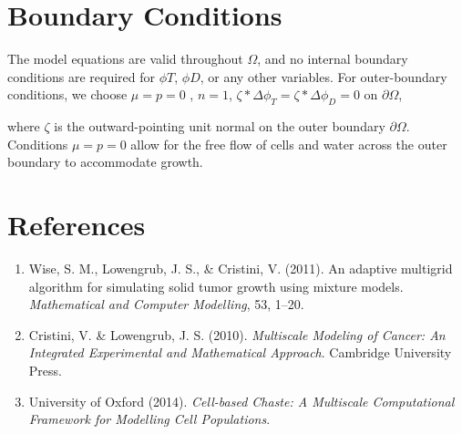 \documentclass[12pt]{article}
\begin{document}
\section*{Boundary Conditions}

 The model equations are valid throughout $\Omega$, and no internal boundary conditions are required for $\phi T$, $\phi D$, or any other variables. For outer-boundary conditions, we choose
$\mu = p = 0$ ,  $n = 1$, $\zeta * \Delta \phi _T = \zeta * \Delta \phi _D = 0$  on $\partial \Omega$,

 where $\zeta$ is the outward-pointing unit normal on the outer boundary $\partial \Omega$. Conditions $\mu = p = 0$ allow for the free flow of cells and water across the outer boundary to accommodate growth. 
 
\section*{References}
\begin{enumerate}
    \item Wise, S. M., Lowengrub, J. S., \& Cristini, V. (2011). An adaptive multigrid algorithm for simulating solid tumor growth using mixture models. \textit{Mathematical and Computer Modelling}, 53, 1–20.
    \item Cristini, V. \& Lowengrub, J. S. (2010). \textit{Multiscale Modeling of Cancer: An Integrated Experimental and Mathematical Approach}. Cambridge University Press.
    \item University of Oxford (2014). \textit{Cell-based Chaste: A Multiscale Computational Framework for Modelling Cell Populations}.
\end{enumerate}
\end{document}
